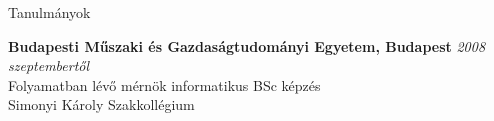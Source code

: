 \documentclass{resume} %
\begin{document}

\begin{rSection}{Tanulmányok}

{\bf Budapesti Műszaki és Gazdaságtudományi Egyetem, Budapest} \hfill {\em 2008 szeptembertől} \\
Folyamatban lévő mérnök informatikus BSc képzés \smallskip \\
Simonyi Károly Szakkollégium
\end{rSection}

\end{document}
